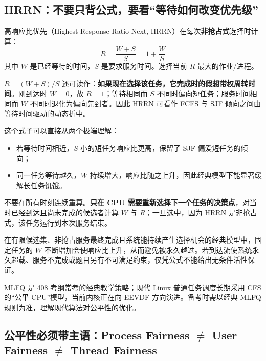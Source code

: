 \documentclass[11pt,a4paper]{ctexart}
\newcommand{\kw}[1]{\textbf{#1}}
\begin{document}
\subsection{HRRN：不要只背公式，要看“等待如何改变优先级”}

高响应比优先（Highest Response Ratio Next, HRRN）在每次\kw{非抢占式}选择时计算：
\[
\boxed{
R=\frac{W+S}{S}=1+\frac{W}{S}
}
\]
其中 $W$ 是已经等待的时间，$S$ 是要求服务时间。选择当前 $R$ 最大的作业/进程。

$R=(W+S)/S$ 还可读作：\kw{如果现在选择该任务，它完成时的假想带权周转时间}。刚到达时 $W=0$，故 $R=1$；等待相同而 $S$ 不同时偏向短任务；服务时间相同而 $W$ 不同时退化为偏向先到者。因此 HRRN 可看作 FCFS 与 SJF 倾向之间由等待时间驱动的动态折中。

这个式子可以直接从两个极端理解：
\begin{itemize}
\item 若等待时间相近，$S$ 小的短任务响应比更高，保留了 SJF 偏爱短任务的倾向；
\item 同一任务等待越久，$W$ 持续增大，响应比随之上升，因此经典模型下能显著缓解长任务饥饿。
\end{itemize}

\begin{exam}
不要在所有时刻连续重算。\kw{只在 CPU 需要重新选择下一个任务的决策点}，对当时已经到达且尚未完成的候选者计算 $W$ 与 $R$；一旦选中，因为 HRRN 是非抢占式，该任务运行到本次服务结束。
\end{exam}

\begin{warn}
在有限候选集、非抢占服务最终完成且系统能持续产生选择机会的经典模型中，固定任务的 $W$ 不断增加会使响应比上升，从而避免被永久越过。若到达流使系统永久超载、服务不完成或题目另有不可满足约束，仅凭公式不能给出无条件活性保证。
\end{warn}

\begin{warn}
MLFQ 是 408 考纲常考的经典教学策略；现代 Linux 普通任务调度长期采用 CFS 的“公平 CPU”模型，当前内核正在向 EEVDF 方向演进。备考时需以经典 MLFQ 规则为准，理解现代算法对公平性的优化。
\end{warn}

\subsection{公平性必须带主语：Process Fairness $\neq$ User Fairness $\neq$ Thread Fairness}
\end{document}

